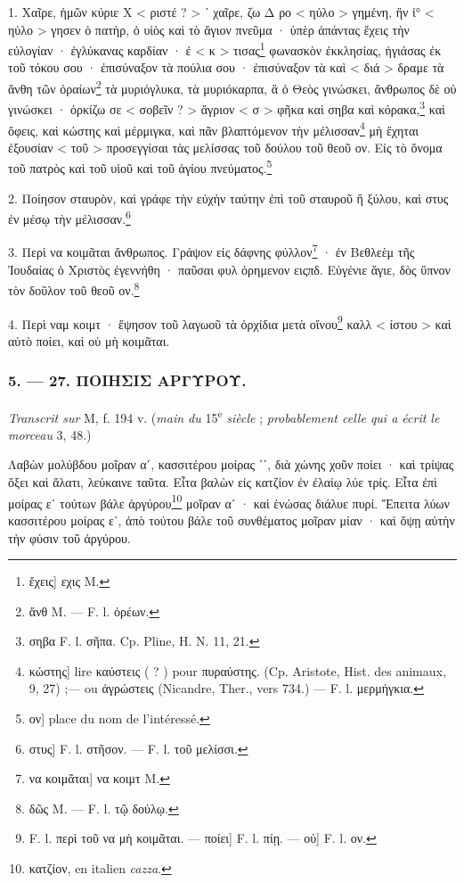 \documentclass[a4paper, 11pt, oneside, polutonikogreek, french]{article}
\newcommand*\svgA{}
\begin{document}
1. Χαῖρε, ἡμῶν κύριε Χ < ριστέ ? > ʹ χαῖρε, ζω     Δ ρο < ηὐλο > γημένη, ἣν ἰ° < ηὐλο > γησεν ὁ πατὴρ, ὁ υἱὸς καὶ τὸ ἅγιον πνεῦμα · ὑπὲρ ἁπάντας ἔχεις τὴν εὐλογίαν · ἐγλύκανας καρδίαν · ἐ < κ > τισας\footnote{ἔχεις] εχις M.} φωνασκὸν ἐκκλησίας, ἡγιάσας ἐκ τοῦ τόκου σου · ἐπισύναξον τὰ πούλια σου · ἐπισύναξον τὰ      καὶ < διά > δραμε τὰ ἄνθη τῶν ὀραίων\footnote{ἄνθ M. --- F. l. ὀρέων.} τὰ μυριόγλυκα, τὰ μυριόκαρπα, ἃ ὁ Θεὸς γινώσκει, ἄνθρωπος δὲ οὐ γινώσκει · ὀρκίζω σε < σοβεῖν ? > ἄγριον < σ > φῆκα καὶ σηβα καὶ κόρακα,\footnote{σηβα F. l. σῆπα. Cp. Pline, H. N. 11, 21.} καὶ ὄφεις, καὶ κώστης καὶ μέρμιγκα, καὶ πᾶν βλαπτόμενον τὴν μέλισσαν\footnote{κώστης] lire καύστεις ( ? ) pour πυραύστης. (Cp. Aristote, Hist. des animaux, 9, 27) ;--- ou ἀγρώστεις (Nicandre, Ther., vers 734.) --- F. l. μερμήγκια.} μὴ ἔχηται ἐξουσίαν < τοῦ > προσεγγίσαι τὰς μελίσσας τοῦ δούλου τοῦ θεοῦ ον. Εἰς τὸ ὄνομα τοῦ πατρὸς καὶ τοῦ υἱοῦ καὶ τοῦ ἁγίου πνεύματος.\footnote{ον] place du nom de l'intéressé.}

2. Ποίησον σταυρὸν, καὶ γράφε τὴν εὐχὴν ταύτην ἐπὶ τοῦ σταυροῦ ἢ ξύλου, καὶ στυς ἐν μέσῳ τὴν μέλισσαν.\footnote{στυς] F. l. στῆσον. --- F. l. τοῦ μελίσσι.}

3. Περὶ να κοιμᾶται ἄνθρωπος. Γράψον εἰς δάφνης φύλλον\footnote{να κοιμᾶται] να κοιμτ M.} · ἐν Βεθλεὲμ τῆς Ἰουδαίας ὁ Χριστὸς ἐγεννήθη · παῦσαι φυλ ὀρημενον ειςπδ. Εὐγένιε ἅγιε, δὸς ὕπνον τὸν δοῦλον τοῦ θεοῦ ον.\footnote{δῶς M. --- F. l. τῷ δούλῳ.}

4. Περὶ ναμ κοιμτ · ἕψησον τοῦ λαγωοῦ τὰ ὀρχίδια μετὰ οἴνου\footnote{F. l. περὶ τοῦ να μὴ κοιμᾶται. --- ποίει] F. l. πίῃ. --- οὐ] F. l. ον.} καλλ < ίστου > καὶ αὐτὸ ποίει, καὶ οὐ μὴ κοιμᾶται.

\bigskip
\centerline{\EightStarTaper}
\centerline{\EightStarTaper\EightStarTaper}
\bigskip

\subsubsection{5. --- 27. ΠΟΙΗΣΙΣ ΑΡΓΥΡΟΥ.}

\emph{Transcrit sur} M, f. 194 v. (\emph{main du} 15\textsuperscript{e} \emph{siècle} ; \emph{probablement celle qui a écrit le morceau} 3, 48.)

\bigskip

Λαβὼν μολύβδου μοῖραν αʹ, κασσιτέρου μοίρας $\svgA$ʹʹ, διὰ χώνης χοῦν ποίει · καὶ τρίψας ὄξει καὶ ἅλατι, λεύκαινε ταῦτα. Εἶτα βαλὼν εἰς κατζίον ἐν ἐλαίῳ λύε τρίς. Εἶτα ἐπὶ μοίρας εʹ τούτων βάλε ἀργύρου\footnote{κατζίον, en italien \emph{cazza}.} μοῖραν αʹ · καὶ ἑνώσας διάλυε πυρί. Ἔπειτα λύων κασσιτέρου μοίρας εʹ, ἀπὸ τούτου βάλε τοῦ συνθέματος μοῖραν μίαν · καὶ ὄψῃ αὐτὴν τὴν φύσιν τοῦ ἀργύρου.
\end{document}
